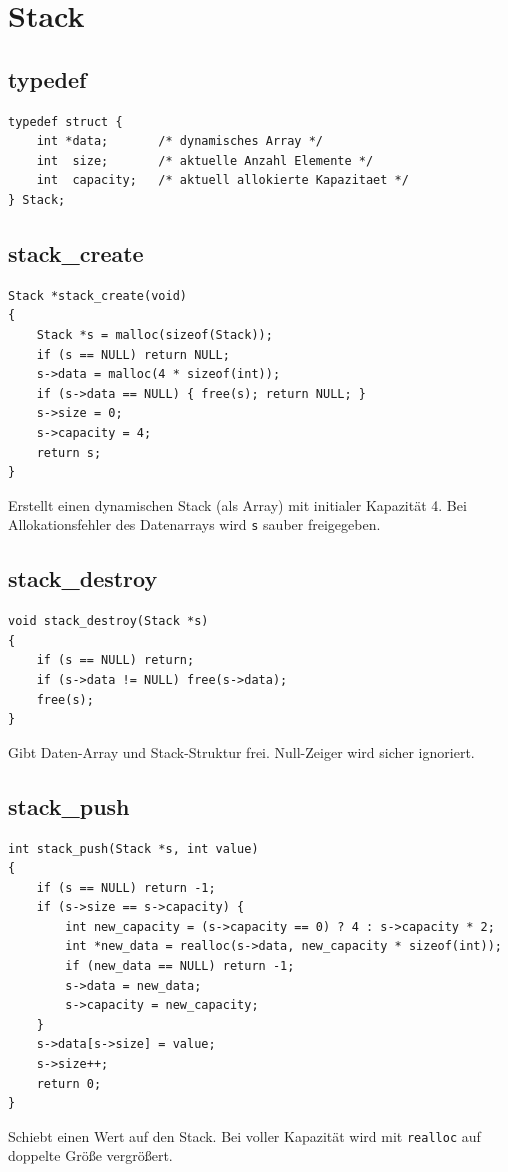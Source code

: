 \documentclass[10pt, a4paper]{article}
\begin{document}
\newpage
\section{Stack}

\subsection{typedef}
\begin{lstlisting}
typedef struct {
    int *data;       /* dynamisches Array */
    int  size;       /* aktuelle Anzahl Elemente */
    int  capacity;   /* aktuell allokierte Kapazitaet */
} Stack;
\end{lstlisting}

\subsection{stack\_create}
\begin{lstlisting}
Stack *stack_create(void)
{
    Stack *s = malloc(sizeof(Stack));
    if (s == NULL) return NULL;
    s->data = malloc(4 * sizeof(int));
    if (s->data == NULL) { free(s); return NULL; }
    s->size = 0;
    s->capacity = 4;
    return s;
}
\end{lstlisting}
Erstellt einen dynamischen Stack (als Array) mit initialer Kapazit\"at 4. Bei Allokationsfehler des Datenarrays wird \texttt{s} sauber freigegeben.

\subsection{stack\_destroy}
\begin{lstlisting}
void stack_destroy(Stack *s)
{
    if (s == NULL) return;
    if (s->data != NULL) free(s->data);
    free(s);
}
\end{lstlisting}
Gibt Daten-Array und Stack-Struktur frei. Null-Zeiger wird sicher ignoriert.

\subsection{stack\_push}
\begin{lstlisting}
int stack_push(Stack *s, int value)
{
    if (s == NULL) return -1;
    if (s->size == s->capacity) {
        int new_capacity = (s->capacity == 0) ? 4 : s->capacity * 2;
        int *new_data = realloc(s->data, new_capacity * sizeof(int));
        if (new_data == NULL) return -1;
        s->data = new_data;
        s->capacity = new_capacity;
    }
    s->data[s->size] = value;
    s->size++;
    return 0;
}
\end{lstlisting}
Schiebt einen Wert auf den Stack. Bei voller Kapazit\"at wird mit \texttt{realloc} auf doppelte Gr\"o\ss e vergr\"o\ss ert.
\end{document}
